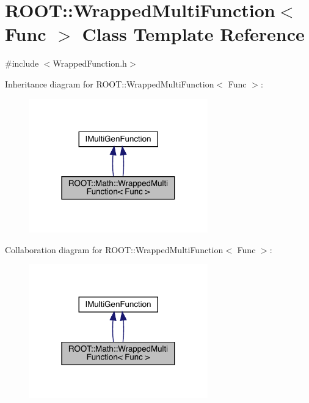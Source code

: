 \hypertarget{classROOT_1_1Math_1_1WrappedMultiFunction}{}\section{R\+O\+OT\+:\+:Wrapped\+Multi\+Function$<$ Func $>$ Class Template Reference}
\label{classROOT_1_1Math_1_1WrappedMultiFunction}


{\ttfamily \#include $<$Wrapped\+Function.\+h$>$}



Inheritance diagram for R\+O\+OT\+:\+:Wrapped\+Multi\+Function$<$ Func $>$\+:\nopagebreak
\begin{figure}[H]
\begin{center}
\leavevmode
\includegraphics[width=219pt]{db/d4c/classROOT_1_1Math_1_1WrappedMultiFunction__inherit__graph}
\end{center}
\end{figure}


Collaboration diagram for R\+O\+OT\+:\+:Wrapped\+Multi\+Function$<$ Func $>$\+:\nopagebreak
\begin{figure}[H]
\begin{center}
\leavevmode
\includegraphics[width=219pt]{dc/d27/classROOT_1_1Math_1_1WrappedMultiFunction__coll__graph}
\end{center}
\end{figure}
